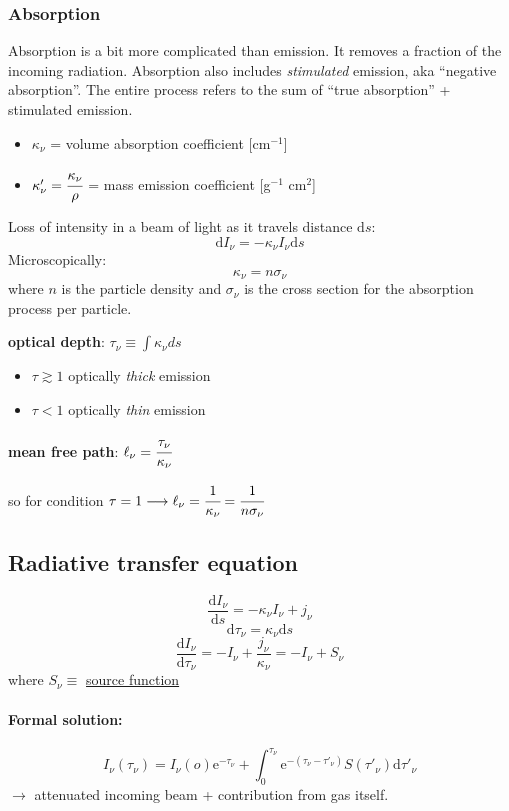 \documentclass[11pt]{article}
\newcommand{\mar}[1]{\hspace{0pt}\marginpar{-\textcolor{black}{#1}-}}
\begin{document}
\subsubsection{Absorption}
Absorption is a bit more complicated than emission. It removes a fraction
of the incoming radiation. Absorption also includes \textit{stimulated}
emission, aka ``negative absorption''. The entire process refers to the sum
of ``true absorption'' + stimulated emission.
\begin{itemize}[label={}, itemsep=0ex]
    \item \mar{26}$\kappa_{\nu}$ =  volume absorption coefficient [cm$^{-1}$]
    \item $\kappa'_{\nu} = \cfrac{\kappa_{\nu}}{\rho}$
        = mass emission coefficient [g$^{-1}$ cm$^{2}$]
\end{itemize}
Loss of intensity in a beam of light as it travels distance $\mathrm{d}s$:
\[
    \mathrm{d}I_{\nu} = -\kappa_{\nu}I_{\nu}\mathrm{d}s
    \]
Microscopically:
\[
    \kappa_{\nu} = n\sigma_{\nu}
    \]
where $n$ is the particle density and $\sigma_{\nu}$ is the cross section
for the absorption process per particle.

\textbf{optical depth}: $ \tau_{\nu} \equiv \int{\kappa_{\nu}ds} $
\begin{itemize}
    \item $\tau \gtrsim 1$ optically \emph{thick} emission
    \item $\tau < 1$ optically \emph{thin} emission
\end{itemize}

\textbf{mean free path}: $ \ell_{\nu} = \cfrac{\tau_{\nu}}{\kappa_{\nu}} $

so for condition $\tau=1 \longrightarrow \ell_{\nu} = \cfrac{1}{\kappa_{\nu}} =
\cfrac{1}{n\sigma_{\nu}}$

\newpage
\subsection{Radiative transfer equation}
\[
    \frac{\mathrm{d}I_{\nu}}{\mathrm{d}s} = -\kappa_{\nu}I_{\nu} + j_{\nu}
    \]
\[
    \mathrm{d}\tau_{\nu} = \kappa_{\nu}\mathrm{d}s
    \]
\[
    \frac{\mathrm{d}I_{\nu}}{\mathrm{d}\tau_{\nu}} =
    -I_{\nu} + \frac{j_{\nu}}{\kappa_{\nu}} = -I_{\nu} + S_{\nu}
    \]
where $S_{\nu} \equiv$ \underline{source function}

\paragraph{Formal solution:}
\[
    I_{\nu}(\tau_{\nu}) = I_{\nu}(o)\mathrm{e}^{-\tau_{\nu}} +
        \int_{0}^{\tau_{\nu}}\!{\mathrm{e}^{-(\tau_{\nu}-\tau'_{\nu})}
        S(\tau'_{\nu})\mathrm{d}\tau'_{\nu}}
        \]
\mar{27}$\rightarrow$ attenuated incoming beam + contribution from gas itself.
\end{document}
